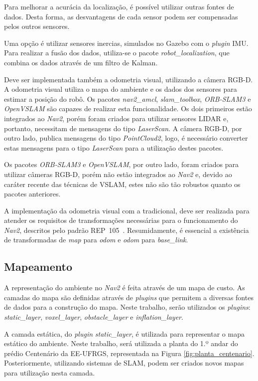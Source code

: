 \documentclass[repeatfields,xlists,xpacks,oneside,yearsonly]{ufrgscca}
\begin{document}
Para melhorar a acurácia da localização, é possível utilizar outras fontes de dados.
Desta forma, as desvantagens de cada sensor podem ser compensadas pelos outros
sensores.

Uma opção é utilizar sensores inercias, simulados no Gazebo com o
\textit{plugin} IMU.
Para realizar a fusão dos dados, utiliza-se o pacote \textit{robot\_localization},
que combina os dados através de um filtro de Kalman.

Deve ser implementada também a odometria visual, utilizando a câmera RGB-D.
A odometria visual utiliza o mapa do ambiente e os dados dos sensores para estimar
a posição do robô.
Os pacotes \textit{nav2\_amcl}, \textit{slam\_toolbox}, \textit{ORB-SLAM3}
e \textit{OpenVSLAM} são capazes de realizar esta funcionalidade.
Os dois primeiros estão integrados ao \textit{Nav2},
porém foram criados para utilizar sensores LIDAR e, portanto,
necessitam de mensagens do tipo \textit{LaserScan}.
A câmera RGB-D, por outro lado, publica mensagens do tipo \textit{PointCloud2},
logo, é necessário converter estas mensagens para o tipo \textit{LaserScan}
para a utilização destes pacotes.

Os pacotes \textit{ORB-SLAM3} e \textit{OpenVSLAM}, por outro lado, foram
criados para utilizar câmeras RGB-D, porém não estão integrados ao \textit{Nav2} e,
devido ao caráter recente das técnicas de VSLAM, estes não são tão robustos quanto os
pacotes anteriores.

A implementação da odometria visual com a tradicional, deve ser realizada
para atender os requisitos de transformações necessárias para o
funcionamento do \textit{Nav2}, descritos pelo padrão
REP~105~\cite{rep_105}. Resumidamente, é essencial a existência
de transformadas de \textit{map} para \textit{odom} e
\textit{odom} para \textit{base\_link}.

\subsection{Mapeamento}

A representação do ambiente no \textit{Nav2} é feita através de um mapa de custo.
As camadas do mapa são definidas através de \textit{plugins} que permitem a
diversas fontes de dados para a construção do mapa.
Neste trabalho, serão utilizados os \textit{plugins}: \textit{static\_layer},
\textit{voxel\_layer}, \textit{obstacle\_layer} e \textit{inflation\_layer}.

A camada estática, do \textit{plugin} \textit{static\_layer},
é utilizada para representar o mapa estático do ambiente.
Neste trabalho, será utilizada a planta do 1.º andar do prédio Centenário da EE-UFRGS,
representada na Figura \ref{fig:planta_centenario}.
Posteriormente, utilizando sistemas de SLAM, podem ser criados novos mapas
para utilização nesta camada.
\end{document}
